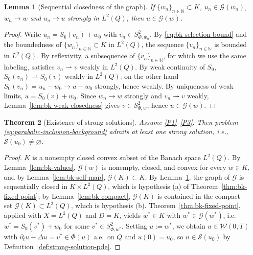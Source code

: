 \documentclass[11pt]{elsarticle}
\newtheorem{theorem}{Theorem}[section]
\newtheorem{lemma}[theorem]{Lemma}
\theoremstyle{definition}
\theoremstyle{remark}
\numberwithin{equation}{section}
\begin{document}
\begin{lemma}[Sequential closedness of the graph]
	\label{lem:bk-graph}
	If $\{w_n\}_{n\in\mathbb{N}}\subset K$, $u_n\in\mathcal{G}(w_n)$, $w_n\to w$ and
	$u_n\to u$ strongly in $L^2(Q)$, then $u\in\mathcal{G}(w)$.
\end{lemma}

\begin{proof}
	Write $u_n=S_0(v_n)+w_0$ with $v_n\in S^2_{\Phi,w_n}$. By
	\eqref{eq:bk-selection-bound} and the boundedness of
	$\{w_n\}_{n\in\mathbb{N}}\subset K$ in $L^2(Q)$, the sequence $\{v_n\}_{n\in\mathbb{N}}$ is bounded in
	$L^2(Q)$. By reflexivity, a subsequence of $\{v_n\}_{n\in\mathbb{N}}$, for which we use the same labeling, satisfies
	$v_n\rightharpoonup v$ weakly in $L^2(Q)$. By weak continuity
	of $S_0$, $S_0(v_n)\rightharpoonup S_0(v)$ weakly in $L^2(Q)$; on
	the other hand $S_0(v_n)=u_n-w_0\to u-w_0$ strongly, hence weakly.
	By uniqueness of weak limits, $u=S_0(v)+w_0$. Since $w_n\to w$
	strongly and $v_n\rightharpoonup v$ weakly,
	Lemma~\ref{lem:bk-weak-closedness} gives $v\in S^2_{\Phi,w}$, hence
	$u\in\mathcal{G}(w)$.
\end{proof}

\begin{theorem}[Existence of strong solutions]
	\label{thm:existence-pde}
	Assume {\rm \ref{P1}--\ref{P3}}. Then problem
	\eqref{eq:parabolic-inclusion-background} admits at least one strong
	solution, i.e., $\mathcal{S}(u_0)\neq\varnothing$.
\end{theorem}

\begin{proof}
	$K$ is a nonempty closed convex subset of the Banach space $L^2(Q)$.
	By Lemma~\ref{lem:bk-values}, $\mathcal{G}(w)$ is nonempty, closed,
	and convex for every $w\in K$, and by Lemma~\ref{lem:bk-self-map},
	$\mathcal{G}(K)\subset K$. By Lemma~\ref{lem:bk-graph}, the graph of
	$\mathcal{G}$ is sequentially closed in $K\times L^2(Q)$, which is
	hypothesis \textup{(a)} of Theorem~\ref{thm:bk-fixed-point}; by
	Lemma~\ref{lem:bk-compact}, $\mathcal{G}(K)$ is contained in the
	compact set $\overline{\mathcal{G}(K)}\subset L^2(Q)$, which is
	hypothesis \textup{(b)}. Theorem~\ref{thm:bk-fixed-point}, applied
	with $X=L^2(Q)$ and $D=K$, yields $w^\ast\in K$ with
	$w^\ast\in\mathcal{G}(w^\ast)$, i.e.\ $w^\ast=S_0(v^\ast)+w_0$ for
	some $v^\ast\in S^2_{\Phi,w^\ast}$. Setting $u:=w^\ast$, we obtain
	$u\in\mathcal{W}(0,T)$ with $\partial_t u-\Delta u=v^\ast\in\Phi(u)$
	a.e.\ on $Q$ and $u(0)=u_0$, so $u\in\mathcal{S}(u_0)$ by
	Definition~\ref{def:strong-solution-pde}.
\end{proof}
\end{document}
